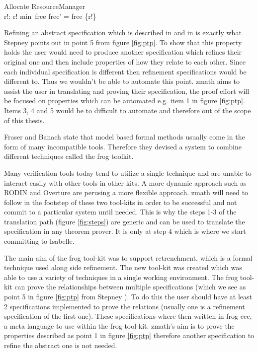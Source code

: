 \begin{exam}

\begin{schema}{Allocate}
\Delta ResourceManager \\
r!: \nat
\where
r! \in min~free \land free' = free \setminus \{r!\}
\end{schema}
\label{exam:allocaterefine} 
\end{exam}

Refining an abstract specification which is described in \cite{Woodcock:1996:UZS:235337} and in \cite{spiveyreferencemanual} is exactly what Stepney points out in point 5 from figure \ref{fig:ptp}. To show that this property holds the user would need to produce another specification which refines their original one and then include properties of how they relate to each other. Since each individual specification is different then refinement specifications would be different to. Thus we wouldn't be able to automate this point. \gls{zmath} aims to assist the user in translating and proving their specification, the proof effort will be focused on properties which can be automated e.g. item 1 in figure \ref{fig:ptp}. Items 3, 4 and 5 would be to difficult to automate and therefore out of the scope of this thesis.

Fraser and Banach \cite{DBLP:conf/sefm/FraserB07} state that model based formal methods usually come in the form of many incompatible tools. Therefore they devised a system to combine different techniques called the frog toolkit.

Many verification tools today tend to utilize a single technique and are unable to interact easily with other tools in other kits. A more dynamic approach such as RODIN \cite{Jones05j} and Overture \cite{overture} are perusing a more flexible approach. \gls{zmath} will need to follow in the footstep of these two tool-kits in order to be successful and not commit to a particular system until needed. This is why the steps 1-3 of the translation path (figure \ref{fig:steps}) are generic and can be used to translate the specification in any theorem prover. It is only at step 4 which is where we start committing to Isabelle.

The main aim of the frog tool-kit was to support retrenchment, which is a formal technique used along side refinement. The new tool-kit was created which was able to use a variety of techniques in a single working environment. The frog tool-kit can prove the relationships between multiple specifications (which we see as point 5 in figure \ref{fig:ptp} from Stepney \cite{stepney1998tale}). To do this the user should have at least 2 specifications implemented to prove the relations (usually one is a refinement specification of the first one). These specifications where then written in frog-ccc, a meta language to use within the frog tool-kit. \gls{zmath}'s aim is to prove the properties described as point 1 in figure \ref{fig:ptp} therefore another specification to refine the abstract one is not needed.

